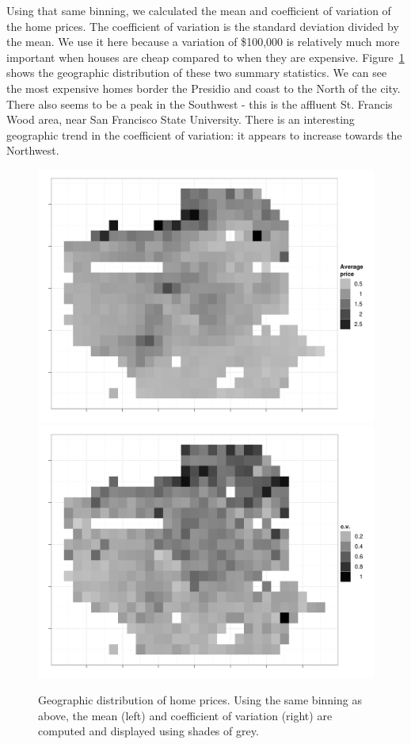 \documentclass[oneside]{article}
\begin{document}
Using that same binning, we calculated the mean and coefficient of variation of the home prices.  The coefficient of variation is the standard deviation divided by the mean.  We use it here because a variation of \$100,000 is relatively much more important when houses are cheap compared to when they are expensive.  Figure~\ref{fig:sf-price} shows the geographic distribution of these two summary statistics.   We can see the most expensive homes border the Presidio and coast to the North of the city.  There also seems to be a peak in the Southwest - this is the affluent St. Francis Wood area, near San Francisco State University.  There is an interesting geographic trend in the coefficient of variation: it appears to increase towards the Northwest.  

\begin{figure}[htbp]
  \centering
    \includegraphics[width=0.5\linewidth]{sf-bin-price}%
    \includegraphics[width=0.5\linewidth]{sf-bin-cv}
  \caption{Geographic distribution of home prices.  Using the same binning as above, the mean (left) and coefficient of variation (right) are computed and displayed using shades of grey.}
  \label{fig:sf-price}
\end{figure}

\end{document}
